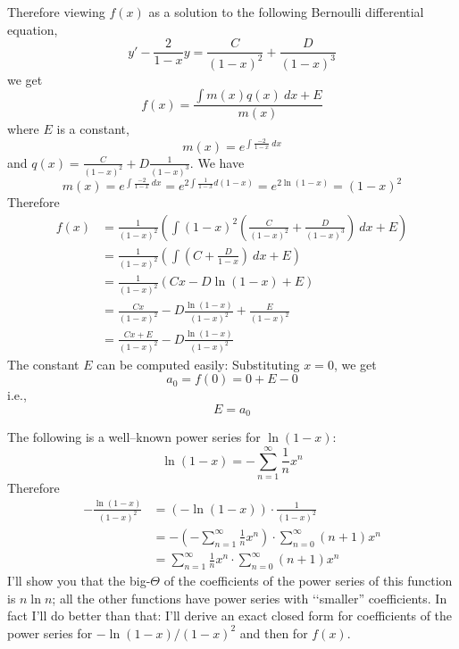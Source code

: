 Therefore viewing $f(x)$ as a solution to the following Bernoulli differential equation,
\[
y' - \frac{2}{1-x} y  = \frac{C}{(1-x)^2}  + \frac{D}{(1-x)^3}
\]
we get
\[
f(x) = \frac{\int m(x) q(x) \ dx + E}{m(x)}
\]
where $E$ is a constant,
\[
m(x) = e^{\int \frac{-2}{1 - x} \ dx}
\]
and $q(x) = \frac{C}{(1-x)^2} + D\frac{1}{(1-x)^3}$.
We have
\[
m(x)
= e^{\int \frac{-2}{1 - x} \ dx}
= e^{2 \int \frac{1}{1 - x} d(1-x)}
= e^{2 \ln (1 - x)}
= (1-x)^2
\]
Therefore
\begin{align*}
f(x)
&= \frac{1}{(1-x)^2}
   \left(
     \int (1-x)^2
     \left(
       \frac{C}{(1-x)^2} + \frac{D}{(1-x)^3}
     \right) \ dx + E 
   \right)
   \\
&= \frac{1}{(1-x)^2}
   \left(
     \int \left( C + \frac{D}{1-x} \right) \ dx + E
   \right)
   \\
&= \frac{1}{(1-x)^2}
   \left(
     C x 
     - D \ln (1-x)
     + E
   \right)
   \\
&=     \frac{Cx}{(1-x)^2} 
     - D \frac{\ln (1-x)}{(1-x)^2}
     + \frac{E}{(1-x)^2}
     \\
&=     \frac{Cx + E}{(1-x)^2} 
     - D \frac{\ln (1-x)}{(1-x)^2}
\end{align*}
The constant $E$ can be computed easily: Substituting $x = 0$, we get
\[
a_0 = f(0) = 0 +  E - 0
\]
i.e.,
\[
E = a_0
\]

The following is a well--known power series for $\ln (1 - x)$:
\[
\ln (1-x) = - \sum_{n=1}^\infty \frac{1}{n} x^n
\]
Therefore
\begin{align*}
-\frac{\ln (1-x)}{(1-x)^2}
&= \left( -\ln (1-x) \right) \cdot \frac{1}{(1-x)^2} \\
&= - \left( -\sum_{n=1}^\infty \frac{1}{n} x^n \right) \cdot
   \sum_{n=0}^\infty (n+1) x^n
   \\
&= \sum_{n=1}^\infty \frac{1}{n} x^n  \cdot
   \sum_{n=0}^\infty (n+1) x^n
\end{align*}
I'll show you that the big-$\Theta$ of the coefficients of the power
series of this function is $n \ln n$; all the other functions
have power series with \lq\lq smaller'' coefficients.
In fact I'll do better than that: I'll derive an exact closed form for
coefficients of the power series for $-\ln(1-x)/(1-x)^2$ and then for $f(x)$.

